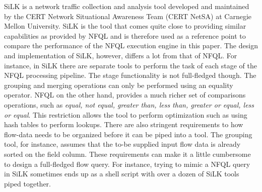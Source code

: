 SiLK \cite{SiLK} is a network traffic collection and analysis tool developed
and maintained by the CERT Network Situational Awareness Team (CERT NetSA) at
Carnegie Mellon University.  SiLK is the tool that comes quite close to
providing similar capabilities as provided by \ac{NFQL} and is therefore used
as a reference point to compare the performance of the \ac{NFQL} execution
engine in this paper. The design and implementation of SiLK, however, differs
a lot from that of \ac{NFQL}. For instance, in SiLK there are separate tools
to perform the task of each stage of the \ac{NFQL} processing pipeline. The
stage functionality is not full-fledged though. The grouping and merging
operations can only be performed using an equality operator. \ac{NFQL} on the
other hand, provides a much richer set of comparisons operations, such as
\emph{equal, not equal, greater than, less than, greater or equal, less or
equal}. This restriction allows the tool to perform optimization such as using
hash tables to perform lookups.  There are also stringent requirements to how
flow-data needs to be organized before it can be piped into a tool. The
grouping tool, for instance, assumes that the to-be supplied input flow data
is already sorted on the field column.  These requirements can make it a
little cumbersome to design a full-fledged flow query.  For instance, trying
to mimic a \ac{NFQL} query in SiLK sometimes ends up as a shell script with
over a dozen of SiLK tools piped together.

